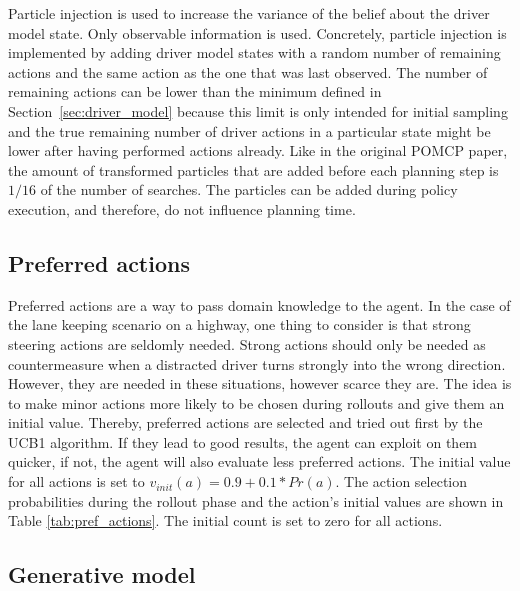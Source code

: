 Particle injection is used to increase the variance of the belief about the driver model state. Only observable information is used. Concretely, particle injection is implemented by adding driver model states with a random number of remaining actions and the same action as the one that was last observed. The number of remaining actions can be lower than the minimum defined in Section~\ref{sec:driver_model} because this limit is only intended for initial sampling and the true remaining number of driver actions in a particular state might be lower after having performed actions already. Like in the original POMCP paper, the amount of transformed particles that are added before each planning step is $1/16$ of the number of searches. The particles can be added during policy execution, and therefore, do not influence planning time.



\subsection{Preferred actions}
\label{sec:preferred_actions}

Preferred actions are a way to pass domain knowledge to the agent. In the case of the lane keeping scenario on a highway, one thing to consider is that strong steering actions are seldomly needed. Strong actions should only be needed as countermeasure when a distracted driver turns strongly into the wrong direction. However, they are needed in these situations, however scarce they are. The idea is to make minor actions more likely to be chosen during rollouts and give them an initial value. Thereby, preferred actions are selected and tried out first by the UCB1 algorithm. If they lead to good results, the agent can exploit on them quicker, if not, the agent will also evaluate less preferred actions. The initial value for all actions is set to  $ v_{init}(a) = 0.9 + 0.1 * Pr(a)$. The action selection probabilities during the rollout phase and the action's initial values are shown in Table \ref{tab:pref_actions}. The initial count is set to zero for all actions.



\subsection{Generative model}
\label{sec:gen_model}

